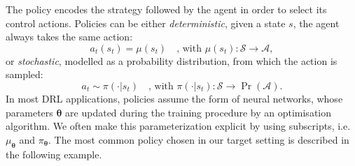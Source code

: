 The policy encodes the strategy followed by the agent in order to select its control actions.
Policies can be either \emph{deterministic}, \ie given a state $s$, the agent always takes the same action:
%
\begin{equation*}
    a_t(s_t) = \mu(s_t) \quad \text{, with } \mu(s_t): \mathcal{S} \to \mathcal{A},
\end{equation*}
%
or \emph{stochastic}, \ie modelled as a probability distribution, from which the action is sampled:
%
\begin{equation*}
    a_t \sim \pi(\cdot|s_t) \quad \text{, with } \pi(\cdot|s_t): \mathcal{S} \to \operatorname{Pr}(\mathcal{A}).
\end{equation*}
%
In most \ac{DRL} applications, policies assume the form of neural networks, whose parameters $\boldsymbol{\theta}$ are updated during the training procedure by an optimisation algorithm.
We often make this parameterization explicit by using subscripts, i.e.\ $\mu_{\boldsymbol{\theta}}$ and $\pi_{\boldsymbol{\theta}}$.
%
The most common policy chosen in our target setting is described in the following example.
%
